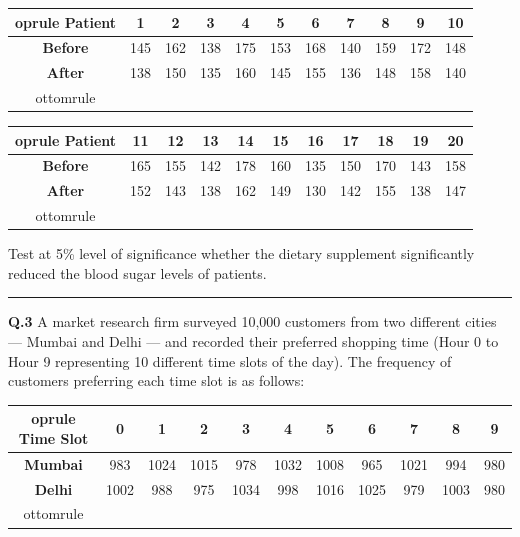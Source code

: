 \documentclass[11pt,a4paper]{article}
\begin{document}
\begin{center}
\small

\begin{tabular}{ccccccccccc}
 oprule
   \textbf{Patient} & 1 & 2 & 3 & 4 & 5 & 6 & 7 & 8 & 9 & 10 \\
\midrule
   \textbf{Before} & 145 & 162 & 138 & 175 & 153 & 168 & 140 & 159 & 172 & 148 \\
   \textbf{After} & 138 & 150 & 135 & 160 & 145 & 155 & 136 & 148 & 158 & 140 \\
ottomrule
\end{tabular}

\vspace{6pt}


\begin{tabular}{ccccccccccc}
 oprule
   \textbf{Patient} & 11 & 12 & 13 & 14 & 15 & 16 & 17 & 18 & 19 & 20 \\
\midrule
   \textbf{Before} & 165 & 155 & 142 & 178 & 160 & 135 & 150 & 170 & 143 & 158 \\
   \textbf{After} & 152 & 143 & 138 & 162 & 149 & 130 & 142 & 155 & 138 & 147 \\
ottomrule
\end{tabular}
\end{center}

Test at 5\% level of significance whether the dietary supplement significantly reduced the blood sugar levels of patients.

\medskip\rule{\linewidth}{0.2pt}\medskip




\noindent   \textbf{Q.3} A market research firm surveyed 10,000 customers from two different cities --- Mumbai and Delhi --- and recorded their preferred shopping time (Hour 0 to Hour 9 representing 10 different time slots of the day). The frequency of customers preferring each time slot is as follows:


\begin{center}
\small

\begin{tabular}{ccccccccccc}
 oprule
   \textbf{Time Slot} & 0 & 1 & 2 & 3 & 4 & 5 & 6 & 7 & 8 & 9 \\
\midrule
   \textbf{Mumbai} & 983 & 1024 & 1015 & 978 & 1032 & 1008 & 965 & 1021 & 994 & 980 \\
   \textbf{Delhi} & 1002 & 988 & 975 & 1034 & 998 & 1016 & 1025 & 979 & 1003 & 980 \\
ottomrule
\end{tabular}
\end{center}
\end{document}
